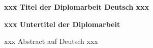 





{
\raggedright
\textbf{\Large{xxx Titel der Diplomarbeit Deutsch xxx}}

}

\textbf{xxx Untertitel der Diplomarbeit}

\vspace*{1cm}

xxx Abstract auf Deutsch xxx


